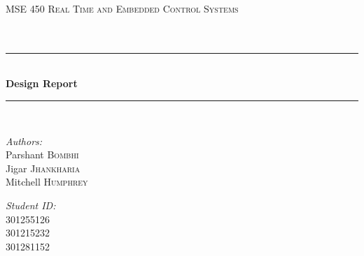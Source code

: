 \documentclass[12pt]{article}
\begin{document}
\begin{titlepage}

\newcommand{\HRule}{\rule{\linewidth}{0.5mm}} %

\center %
 

\textsc{\LARGE MSE 450 Real Time and Embedded Control Systems}\\[1.5cm] %
\textsc{\Large }\\[0.5cm] %
\textsc{\large }\\[0.5cm] %


\HRule \\[0.4cm]
{ \huge \bfseries Design Report}\\[0.4cm] %
\HRule \\[1.5cm]
 

\begin{minipage}{0.4\textwidth}
    \begin{flushleft} \large
        \emph{Authors:}\\
        Parshant \textsc{Bombhi}\\
        Jigar \textsc{Jhankharia}\\
        Mitchell \textsc{Humphrey}
    \end{flushleft}
\end{minipage}
\hfill
\begin{minipage}{0.4\textwidth}
    \begin{flushright} \large
        \emph{Student ID:} \\
        301255126\\
        301215232\\
        301281152
    \end{flushright}
\end{minipage}
\vspace{10mm}


\end{titlepage}
\end{document}
